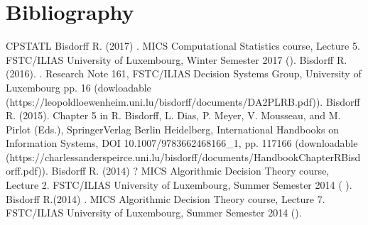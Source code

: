 \documentclass[a4paper,10pt,english]{sphinxhowto}
\begin{document}
\section{Bibliography}
\label{\detokenize{tutorial:bibliography}}
\begin{sphinxthebibliography}{CPSTAT\sphinxhyphen{}L}
Bisdorff R. (2017) . MICS Computational Statistics course, Lecture 5. FSTC/ILIAS University of Luxembourg, Winter Semester 2017 ().
Bisdorff R. (2016). . Research Note 16\sphinxhyphen{}1, FSTC/ILIAS Decision Systems Group, University of Luxembourg pp. 1\sphinxhyphen{}6 (dowloadable   (https://leopold\sphinxhyphen{}loewenheim.uni.lu/bisdorff/documents/DA2PL\sphinxhyphen{}RB.pdf)).
Bisdorff R. (2015).  Chapter 5 in R. Bisdorff, L. Dias, P. Meyer, V. Mousseau, and M. Pirlot (Eds.),  Springer\sphinxhyphen{}Verlag Berlin Heidelberg, International Handbooks on Information Systems, DOI 10.1007/978\sphinxhyphen{}3\sphinxhyphen{}662\sphinxhyphen{}46816\sphinxhyphen{}6\_1, pp. 117\sphinxhyphen{}166 (downloadable  (https://charles\sphinxhyphen{}sanders\sphinxhyphen{}peirce.uni.lu/bisdorff/documents/HandbookChapterRBisdorff.pdf)).
Bisdorff R. (2014)  ? MICS Algorithmic Decision Theory course, Lecture 2. FSTC/ILIAS University of Luxembourg, Summer Semester 2014 ( ).
Bisdorff R.(2014)  . MICS Algorithmic Decision Theory course, Lecture 7. FSTC/ILIAS University of Luxembourg, Summer Semester 2014 ().

\end{sphinxthebibliography}
\end{document}
